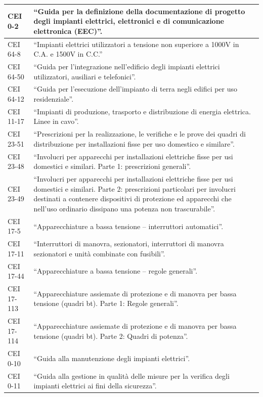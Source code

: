 \begin{longtable}{|p{4cm}|p{10cm}|}
\hline
CEI 0-2 & ``Guida per la definizione della documentazione di progetto degli impianti elettrici, elettronici e di comunicazione elettronica (EEC)''. \\
\hline
CEI 64-8 & ``Impianti elettrici utilizzatori a tensione non superiore a 1000V in C.A. e 1500V in C.C.'' \\
\hline
CEI 64-50 & ``Guida per l'integrazione nell'edificio degli impianti elettrici utilizzatori, ausiliari e telefonici''. \\
\hline
CEI 64-12 & ``Guida per l'esecuzione dell'impianto di terra negli edifici per uso residenziale''. \\
\hline
CEI 11-17 & ``Impianti di produzione, trasporto e distribuzione di energia elettrica. Linee in cavo''. \\
\hline
CEI 23-51 & ``Prescrizioni per la realizzazione, le verifiche e le prove dei quadri di distribuzione per installazioni fisse per uso domestico e similare''. \\
\hline
CEI 23-48 & ``Involucri per apparecchi per installazioni elettriche fisse per usi domestici e similari. Parte 1: prescrizioni generali''. \\
\hline
CEI 23-49 & ``Involucri per apparecchi per installazioni elettriche fisse per usi domestici e similari. Parte 2: prescrizioni particolari per involucri destinati a contenere dispositivi di protezione ed apparecchi che nell'uso ordinario dissipano una potenza non trascurabile''. \\
\hline
CEI 17-5 & ``Apparecchiature a bassa tensione -- interruttori automatici''. \\
\hline
CEI 17-11 & ``Interruttori di manovra, sezionatori, interruttori di manovra sezionatori e unità combinate con fusibili''. \\
\hline
CEI 17-44 & ``Apparecchiature a bassa tensione -- regole generali''. \\
\hline
CEI 17-113 & ``Apparecchiature assiemate di protezione e di manovra per bassa tensione (quadri bt). Parte 1: Regole generali''. \\
\hline
CEI 17-114 & ``Apparecchiature assiemate di protezione e di manovra per bassa tensione (quadri bt). Parte 2: Quadri di potenza''. \\
\hline
CEI 0-10 & ``Guida alla manutenzione degli impianti elettrici''. \\
\hline
CEI 0-11 & ``Guida alla gestione in qualità delle misure per la verifica degli impianti elettrici ai fini della sicurezza''. \\

\end{longtable}
